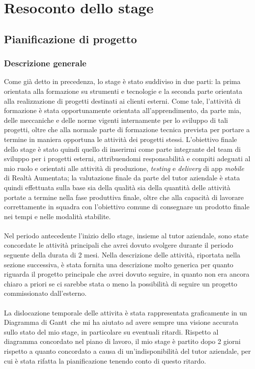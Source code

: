 \section{Resoconto dello stage}
\subsection{Pianificazione di progetto}
\subsubsection{Descrizione generale}
Come gi\`a detto in precedenza, lo stage \`e stato suddiviso in due parti: la prima orientata alla formazione su strumenti e tecnologie e la seconda parte orientata alla realizzazione di progetti destinati ai clienti esterni. Come tale, l’attività di formazione \`e stata opportunamente orientata all’apprendimento, da parte mia, delle meccaniche e delle norme vigenti internamente per lo sviluppo di tali progetti, oltre che alla normale parte di formazione tecnica prevista per portare a termine in maniera opportuna le attività dei progetti stessi.
L’obiettivo finale dello stage \`e stato quindi quello di inserirmi come parte integrante del team di sviluppo per i progetti esterni, attribuendomi responsabilità e compiti adeguati al mio ruolo e orientati alle attività di produzione, \textit{testing} e \textit{delivery} di app \textit{mobile} di Realtà Aumentata; la valutazione finale da parte del tutor aziendale \`e stata quindi effettuata sulla base sia della qualità sia della quantità delle attività portate a termine nella fase produttiva finale, oltre che alla capacità di lavorare correttamente in squadra con l’obiettivo comune di consegnare un prodotto finale nei tempi e nelle modalità stabilite.
\\\\
Nel periodo antecedente l'inizio dello stage, insieme al tutor aziendale, sono state concordate le attivit\`a principali che avrei dovuto svolgere durante il periodo seguente della durata di 2 mesi. Nella descrizione delle attivit\`a, riportata nella sezione successiva, \`e stata fornita una descrizione molto generica per quanto riguarda il progetto principale che avrei dovuto seguire, in quanto non era ancora chiaro a priori se ci sarebbe stata o meno la possibilit\`a di seguire un progetto commissionato dall'esterno.
\\\\
La dislocazione temporale delle attivita \`e stata rappresentata graficamente in un Diagramma di Gantt\gloss\ che mi ha aiutato ad avere sempre una visione accurata sullo stato del mio stage, in particolare su eventuali ritardi. Rispetto al diagramma concordato nel piano di lavoro, il mio stage \`e partito dopo 2 giorni rispetto a quanto concordato a causa di un'indisponibilit\`a del tutor aziendale, per cui \`e stata rifatta la pianificazione tenendo conto di questo ritardo.

